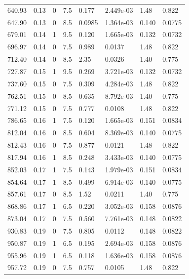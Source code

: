 \documentclass[preview]{standalone}
\begin{document}
{{{\begin{tabular}{L{1.2cm}C{1.2cm} C{0.3cm}C{0.5cm} C{1.4cm}C{1.4cm} C{1.4cm}C{1.4cm}}
  640.93  &  0.13  & 0     & 7.5 &  0.177  & 2.449e-03  & 1.48 &  0.822   \\ 
  647.90  &  0.13  & 0     & 8.5 &  0.0985  & 1.364e-03  & 0.140 &  0.0775   \\ 
  679.01  &  0.14  & 1     & 9.5 &  0.120  & 1.665e-03  & 0.132 &  0.0732   \\ 
  696.97  &  0.14  & 0     & 7.5 &  0.989  & 0.0137  & 1.48 &  0.822   \\ 
  712.40  &  0.14  & 0     & 8.5 &  2.35  & 0.0326  & 1.40 &  0.775   \\ 
  727.87  &  0.15  & 1     & 9.5 &  0.269  & 3.721e-03  & 0.132 &  0.0732   \\ 
  737.60  &  0.15  & 0     & 7.5 &  0.309  & 4.284e-03  & 1.48 &  0.822   \\ 
  762.51  &  0.15  & 0     & 8.5 &  0.635  & 8.792e-03  & 1.40 &  0.775   \\ 
  771.12  &  0.15  & 0     & 7.5 &  0.777  & 0.0108  & 1.48 &  0.822   \\ 
  786.65  &  0.16  & 1     & 7.5 &  0.120  & 1.665e-03  & 0.151 &  0.0834   \\ 
  812.04  &  0.16  & 0     & 8.5 &  0.604  & 8.369e-03  & 0.140 &  0.0775   \\ 
  812.43  &  0.16  & 0     & 7.5 &  0.877  & 0.0121  & 1.48 &  0.822   \\ 
  817.94  &  0.16  & 1     & 8.5 &  0.248  & 3.433e-03  & 0.140 &  0.0775   \\ 
  852.03  &  0.17  & 1     & 7.5 &  0.143  & 1.979e-03  & 0.151 &  0.0834   \\ 
  854.64  &  0.17  & 1     & 8.5 &  0.499  & 6.914e-03  & 0.140 &  0.0775   \\ 
  857.61  &  0.17  & 0     & 8.5 &  1.52  & 0.0211  & 1.40 &  0.775   \\ 
  868.86  &  0.17  & 1     & 6.5 &  0.220  & 3.052e-03  & 0.158 &  0.0876   \\ 
  873.04  &  0.17  & 0     & 7.5 &  0.560  & 7.761e-03  & 0.148 &  0.0822   \\ 
  930.83  &  0.19  & 0     & 7.5 &  0.805  & 0.0112  & 0.148 &  0.0822   \\ 
  950.87  &  0.19  & 1     & 6.5 &  0.195  & 2.694e-03  & 0.158 &  0.0876   \\ 
  955.96  &  0.19  & 1     & 6.5 &  0.118  & 1.636e-03  & 0.158 &  0.0876   \\ 
  957.72  &  0.19  & 0     & 7.5 &  0.757  & 0.0105  & 1.48 &  0.822   \\ 

\end{tabular}}}}
\end{document}
